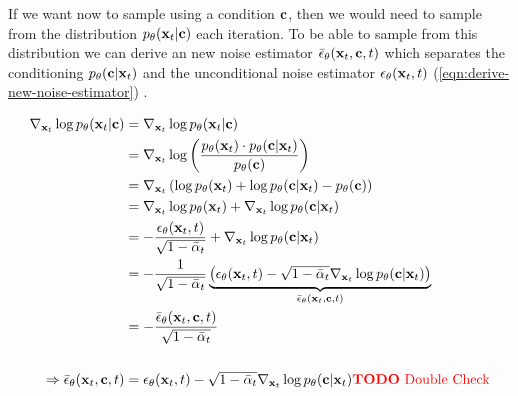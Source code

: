 If we want now to sample using a condition $\mathbf{c}$, then we would need to sample from the distribution $p_\theta(\mathbf{x}_t | \mathbf{c})$ each iteration.
To be able to sample from this distribution we can derive an new noise estimator $\bar{\epsilon}_\theta(\mathbf{x}_t, \mathbf{c}, t)$ which
separates the conditioning $p_\theta(\mathbf{c}|\mathbf{x}_t)$ and the unconditional noise estimator $\epsilon_\theta(\mathbf{x}_t, t)$ (\autoref{eqn:derive-new-noise-estimator}) \parencite{sbgm,diffusion-beats-gans}.

\begin{equation}
   \label{eqn:derive-new-noise-estimator}
   \begin{aligned}
      \nabla_{\x_t} \log p_\theta(\x_t|\ce)           & = \nabla_{\x_t} \log p_\theta(\x_t|\ce)                                                                                                                                                           \\
                                                      & = \nabla_{\x_t} \log \left( \frac{p_\theta(\x_t) \cdot p_\theta(\ce|\x_t)}{p_\theta(\ce)} \right)                                                                                                 \\
                                                      & = \nabla_{\x_t} \left( \log p_\theta(\x_t) + \log p_\theta(\ce|\x_t) - p_\theta(\ce) \right)                                                                                                      \\
                                                      & = \nabla_{\x_t} \log p_\theta(\x_t) + \nabla_{\x_t} \log p_\theta(\ce|\x_t)                                                                                                                       \\
                                                      & =  - \frac{\epsilon_\theta(\x_t, t)}{\sqrt{1 - \bar{\alpha}_t}} + \nabla_{\x_t} \log p_\theta(\ce|\x_t)                                                                                           \\
                                                      & = -\frac{1}{\sqrt{1 - \bar{\alpha}_t}} \underbrace{\left(\epsilon_\theta(\x_t, t) - \sqrt{1 - \bar{\alpha}_t} \nabla_{\x_t} \log p_\theta(\ce|\x_t)\right)}_{\bar{\epsilon}_\theta(\x_t, \ce, t)} \\
                                                      & = -\frac{\bar{\epsilon}_\theta(\x_t, \ce, t)}{\sqrt{1 - \bar{\alpha}_t}}                                                                                                                          \\
      \\
      \Rightarrow \bar{\epsilon}_\theta(\x_t, \ce, t) & = \epsilon_\theta(\x_t, t) - \sqrt{1 - \bar{\alpha}_t} \nabla_{\x_t} \log p_\theta(\ce|\x_t)
      \text{\todo{Double Check}}
   \end{aligned}
\end{equation}

